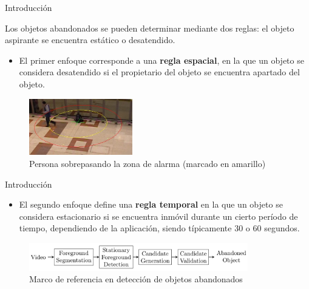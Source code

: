 \begin{frame}{Introducción}

\justifying
Los objetos abandonados se pueden determinar mediante dos reglas: el objeto aspirante se encuentra estático o desatendido.

\vspace{0.1cm}

\begin{itemize}
    \justifying
    \item El primer enfoque corresponde a una \textbf{regla espacial}, en la que un objeto se considera desatendido si el propietario del objeto se encuentra apartado del objeto.
    
\end{itemize}
    
\vspace{0.3cm}

\begin{figure}[ht]
\centering
\includegraphics[width=0.4\textwidth]{Images/introduccion/pets2006-3m.jpeg}
\caption{\label{fig:pets2006-3m}Persona sobrepasando la zona de alarma (marcado en amarillo)}
\end{figure}
    
\end{frame}


\begin{frame}{Introducción}

\begin{itemize}
    \justifying
    \item El segundo enfoque define una \textbf{regla temporal} en la que un objeto se considera estacionario si se encuentra inmóvil durante un cierto período de tiempo, dependiendo de la aplicación, siendo típicamente 30 o 60 segundos.
    
\end{itemize}
    
\vspace{0.3cm}

\begin{figure}[ht]
\centering
\includegraphics[width=0.85\textwidth]{Images/introduccion/canonical-framework-aod.png}
\caption{\label{fig:canonical-framework-aod}Marco de referencia en detección de objetos abandonados}
\end{figure}

\end{frame}

